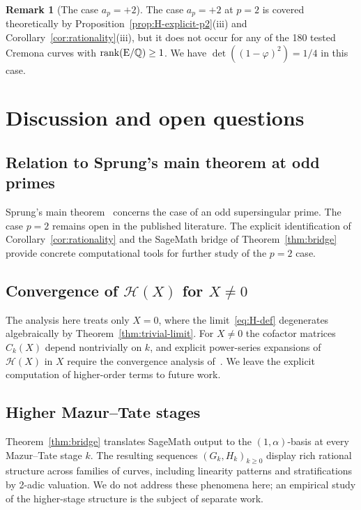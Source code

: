 \documentclass[11pt,a4paper]{amsart}
\theoremstyle{definition}
\newtheorem{remark}[theorem]{Remark}
\newcommand{\Q}{\mathbb{Q}}
\newcommand{\Hcal}{\mathcal{H}}
\begin{document}
\begin{remark}[The case $a_p = +2$]
The case $a_p = +2$ at $p = 2$ is covered theoretically by Proposition~\ref{prop:H-explicit-p2}(iii) and Corollary~\ref{cor:rationality}(iii), but it does not occur for any of the 180 tested Cremona curves with $\rm{rank}(E/\Q) \geq 1$. We have $\det((1-\varphi)^2) = 1/4$ in this case.
\end{remark}

\section{Discussion and open questions}\label{sec:open}

\subsection{Relation to Sprung's main theorem at odd primes}
Sprung's main theorem~\cite{Sprung2016} concerns the case of an odd supersingular prime. The case $p = 2$ remains open in the published literature. The explicit identification of Corollary~\ref{cor:rationality} and the SageMath bridge of Theorem~\ref{thm:bridge} provide concrete computational tools for further study of the $p = 2$ case.

\subsection{Convergence of $\Hcal(X)$ for $X \neq 0$}
The analysis here treats only $X = 0$, where the limit~\eqref{eq:H-def} degenerates algebraically by Theorem~\ref{thm:trivial-limit}. For $X \neq 0$ the cofactor matrices $C_k(X)$ depend nontrivially on $k$, and explicit power-series expansions of $\Hcal(X)$ in $X$ require the convergence analysis of~\cite[\S 4]{Sprung2012}. We leave the explicit computation of higher-order terms to future work.

\subsection{Higher Mazur--Tate stages}
Theorem~\ref{thm:bridge} translates SageMath output to the $(1, \alpha)$-basis at every Mazur--Tate stage $k$. The resulting sequences $(G_k, H_k)_{k\geq 0}$ display rich rational structure across families of curves, including linearity patterns and stratifications by 2-adic valuation. We do not address these phenomena here; an empirical study of the higher-stage structure is the subject of separate work.
\end{document}
